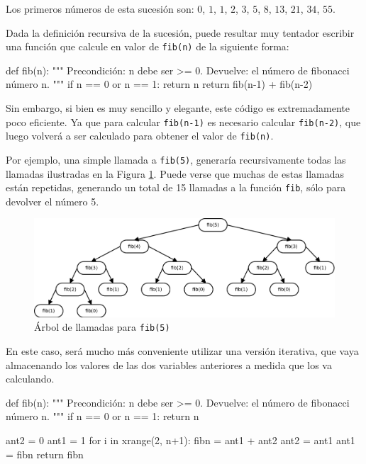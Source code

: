 Los primeros números de esta sucesión son: $0$, $1$, $1$, $2$, $3$, $5$, $8$,
$13$, $21$, $34$, $55$.

Dada la definición recursiva de la sucesión, puede resultar muy tentador
escribir una función que calcule en valor de \lstinline!fib(n)! de la siguiente
forma:

\begin{codigo-python-sn}
def fib(n):
    """ Precondición: n debe ser >= 0.
        Devuelve: el número de fibonacci número n. """
    if n == 0 or n == 1:
        return n
    return fib(n-1) + fib(n-2)
\end{codigo-python-sn}

Sin embargo, si bien es muy sencillo y elegante, este código es extremadamente
poco eficiente.  Ya que para calcular \lstinline!fib(n-1)! es necesario calcular
\lstinline!fib(n-2)!, que luego volverá a ser calculado para obtener el valor de
\lstinline!fib(n)!.

Por ejemplo, una simple llamada a \lstinline!fib(5)!, generaría
recursivamente todas las llamadas ilustradas en la Figura \ref{fibonacci}.
Puede verse que muchas de estas llamadas están repetidas, generando un
total de 15 llamadas a la función \lstinline!fib!, sólo para devolver el
número 5.

\begin{figure}[htb]
\includegraphics{graficos/18_fibonacci}
\caption{Árbol de llamadas para \lstinline!fib(5)!}
\label{fibonacci}
\end{figure}

En este caso, será mucho más conveniente utilizar una versión iterativa,
que vaya almacenando los valores de las dos variables anteriores a medida
que los va calculando.

\newpage

\begin{codigo-python-sn}
def fib(n):
    """ Precondición: n debe ser >= 0.
        Devuelve: el número de fibonacci número n. """
    if n == 0 or n == 1:
        return n

    ant2 = 0
    ant1 = 1
    for i in xrange(2, n+1):
        fibn = ant1 + ant2
        ant2 = ant1
        ant1 = fibn
    return fibn
\end{codigo-python-sn}

